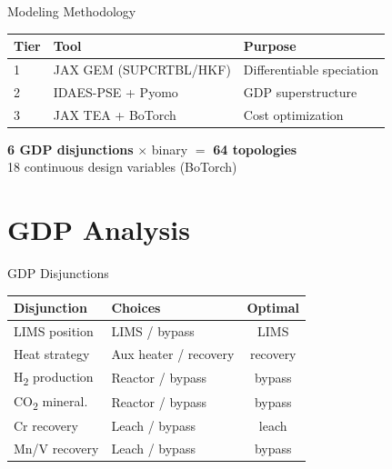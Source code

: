 \documentclass[aspectratio=169]{beamer}
\begin{document}
\begin{frame}{Modeling Methodology}
\begin{table}
\centering
\begin{tabular}{@{}lll@{}}
\toprule
\textbf{Tier} & \textbf{Tool} & \textbf{Purpose} \\
\midrule
1 & JAX GEM (SUPCRTBL/HKF) & Differentiable speciation \\
2 & IDAES-PSE + Pyomo & GDP superstructure \\
3 & JAX TEA + BoTorch & Cost optimization \\
\bottomrule
\end{tabular}
\end{table}
\vspace{1em}
\centering
\textbf{6 GDP disjunctions} $\times$ binary $=$ \textbf{64 topologies}\\[0.5em]
18 continuous design variables (BoTorch)
\end{frame}

\section{GDP Analysis}

\begin{frame}{GDP Disjunctions}
\begin{table}
\centering
\begin{tabular}{@{}llc@{}}
\toprule
\textbf{Disjunction} & \textbf{Choices} & \textbf{Optimal} \\
\midrule
LIMS position        & LIMS / bypass       & \textcolor{StepGreen}{LIMS}  \\
Heat strategy        & Aux heater / recovery & recovery \\
H\textsubscript{2} production & Reactor / \textcolor{StepRed}{bypass} & \textcolor{StepRed}{bypass} \\
CO\textsubscript{2} mineral.  & Reactor / \textcolor{StepRed}{bypass} & \textcolor{StepRed}{bypass} \\
Cr recovery          & \textcolor{StepGreen}{Leach} / bypass & \textcolor{StepGreen}{leach} \\
Mn/V recovery        & Leach / \textcolor{StepRed}{bypass} & \textcolor{StepRed}{bypass} \\
\bottomrule
\end{tabular}
\end{table}
\end{frame}
\end{document}
